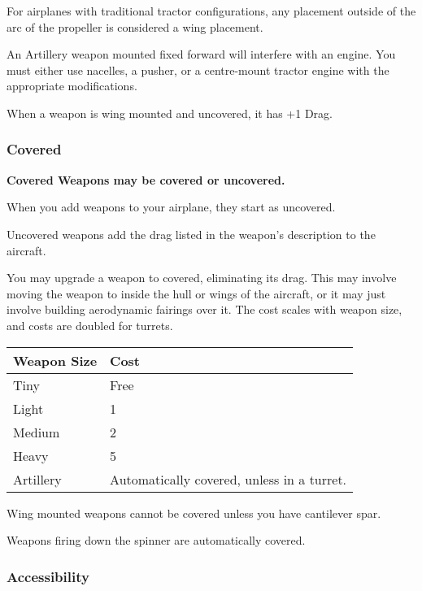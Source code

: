 \documentclass{article}
\begin{document}
For airplanes with traditional tractor configurations, any placement
outside of the arc of the propeller is considered a wing placement.

An Artillery weapon mounted fixed forward will interfere with an engine.
You must either use nacelles, a pusher, or a centre-mount tractor engine
with the appropriate modifications.

When a weapon is wing mounted and uncovered, it has +1 Drag.

\subsubsection{Covered}
\label{_Covered}

\textbf{Covered Weapons may be covered or uncovered.}

When you add weapons to your airplane, they start as uncovered.

Uncovered weapons add the drag listed in the weapon's description to the
aircraft.

You may upgrade a weapon to covered, eliminating its drag. This may
involve moving the weapon to inside the hull or wings of the aircraft,
or it may just involve building aerodynamic fairings over it. The cost
scales with weapon size, and costs are doubled for turrets.

\begin{tabular}{|l|l|}
    \hline
    Weapon Size & Cost                                       \\\hline
    Tiny        & Free                                       \\\hline
    Light       & 1                                          \\\hline
    Medium      & 2                                          \\\hline
    Heavy       & 5                                          \\\hline
    Artillery   & Automatically covered, unless in a turret. \\\hline
\end{tabular}

Wing mounted weapons cannot be covered unless you have cantilever
spar.

Weapons firing down the spinner are automatically covered.

\subsubsection{Accessibility}
\label{_Accessibility}
\end{document}
